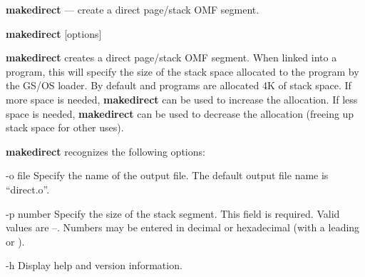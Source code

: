 \documentclass{article}
\def\makedirect{\textbf{makedirect} }
\begin{document}
\makedirect --- create a direct page/stack OMF segment.


\makedirect [options]


\makedirect creates a direct page/stack OMF segment.  When linked into a program, this will
specify the size of the stack space allocated to the program by the GS/OS loader.  By default  and  programs are allocated 4K of stack space.  If more space 
is needed, 
\makedirect can be used to increase the allocation.  If less space is needed, \makedirect
can be used to decrease the allocation (freeing up stack space for other uses).



\makedirect recognizes the following options:
\begin{optionlist}
	\item [-o file]
	Specify the name of the output file.  The default output file name is ``direct.o''.
	\item [-p number]
	Specify the size of the stack segment.  This field is required.  Valid values are 
	--. Numbers may be entered in decimal or hexadecimal 
	(with a leading  or \code{\$}).
	\item [-h]
	Display help and version information.
	
\end{optionlist}
\end{document}
